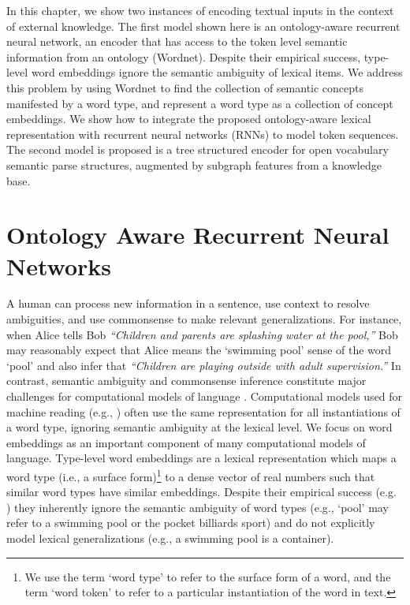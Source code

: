 In this chapter, we show two instances of encoding textual inputs in the context of external knowledge. The first model shown here is an ontology-aware recurrent neural network, an encoder that has access to the token level semantic information from an ontology (Wordnet).
Despite their empirical success, type-level word embeddings ignore the semantic ambiguity of lexical items. We address this problem by using Wordnet to find the collection of semantic concepts manifested by a word type, and represent a word type as a collection of concept embeddings. We show
how to integrate the proposed ontology-aware lexical representation with recurrent neural networks (RNNs) to model token sequences. The second model is proposed is a tree structured encoder for open vocabulary semantic parse structures, augmented by subgraph features from a knowledge base.

\section{Ontology Aware Recurrent Neural Networks}
A human can process new information in a sentence, use context to resolve ambiguities, and use commonsense to make relevant generalizations.
For instance, when Alice tells Bob \textit{``Children and parents are splashing water at the pool,''} Bob may reasonably expect that Alice means the `swimming pool' sense of the word `pool' and also infer that \textit{``Children are playing outside with adult supervision.''}
In contrast, semantic ambiguity and commonsense inference constitute major challenges for computational models of language \citep{yarowsky:94,tanaka:07,celikyilmaz:13,pasca:14}.
Computational models used for machine reading (e.g., \cite{bowman:15}) often use the same representation for all instantiations of a word type, ignoring semantic ambiguity at the lexical level.  We focus on word embeddings as an important component of many computational models of language.
Type-level word embeddings are a lexical representation which maps a word type (i.e., a surface form)\footnote{We use the term `word type' to refer to the surface form of a word, and the term `word token' to refer to a particular instantiation of the word in text.} 
to a dense vector of real numbers such that similar word types have similar embeddings. 
Despite their empirical success (e.g. \cite{socher:10}) they inherently ignore the semantic ambiguity of word types (e.g., `pool' may refer to a swimming pool or the pocket billiards sport)  and do not explicitly model lexical generalizations (e.g., a swimming pool is a container).

